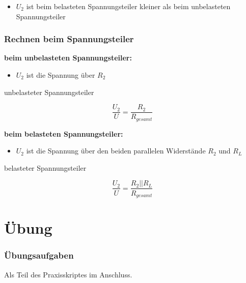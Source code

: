 \begin{frame}
\begin{columns}
\begin{figure}
    \end{figure}
  \end{columns}
  \begin{itemize}
    \item $U_2$ ist beim belasteten Spannungsteiler kleiner als beim unbelasteten Spannungsteiler
  \end{itemize}
\end{frame}

\begin{frame}
  \frametitle{Rechnen beim Spannungsteiler}
  \textbf{beim unbelasteten Spannungsteiler:}
  \begin{itemize}
    \item $U_2$ ist die Spannung über $R_2$
  \end{itemize}
  \begin{block}{unbelasteter Spannungsteiler}
    \begin{center}
      $$\frac{U_2}{U} = \frac{R_2}{R_{gesamt}}$$
    \end{center}
  \end{block}

  \textbf{beim belasteten Spannungsteiler:}
  \begin{itemize}
    \item $U_2$ ist die Spannung über den beiden parallelen Widerstände $R_2$ und $R_L$
  \end{itemize}
  \begin{block}{belasteter Spannungsteiler}
    \begin{center}
      $$\frac{U_2}{U} = \frac{R_{2}||R_{L}}{R_{gesamt}}$$
    \end{center}
  \end{block}
\end{frame}

\section{Übung}

\begin{frame}
  \frametitle{Übungsaufgaben}

  Als Teil des Praxisskriptes im Anschluss.

\end{frame}



